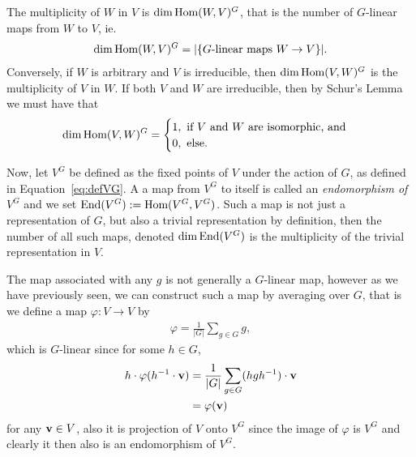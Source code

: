 \begin{proposition}
	The multiplicity of $W$ in $V$ is $\dim \text{Hom}(W,V)^G$, that is the number of $G$-linear maps from $W$ to $V$, ie. \begin{align*}
		\dim \text{Hom}(W,V)^G = |\{\text{$G$-linear maps $W \rightarrow V$}\}|.
	\end{align*}
	Conversely, if $W$ is arbitrary and $V$ is irreducible, then $\dim \text{Hom} (V,W)^G$ is the multiplicity of $V$ in $W$. If both $V$ and $W$ are irreducible, then by Schur's Lemma we must have that
	\begin{align}\label{eq:dimhomVWG}
		\dim \text{Hom} (V,W)^G = \begin{cases}
			1, \text{ if $V$ and $W$ are isomorphic, and} \\
			0, \text{ else.}
		\end{cases}
	\end{align}
\end{proposition}

Now, let $V^G$ be defined as the fixed points of $V$ under the action of $G$, as defined in Equation~\ref{eq:defVG}. A a map from $V^G$ to itself is called an \textit{endomorphism of $V^G$} and we set $\text{End}(V^G) := \text{Hom}(V^G, V^G)$. Such a map is not just a representation of $G$, but also a trivial representation by definition, then the number of all such maps, denoted $\dim \text{End}(V^G)$ is the multiplicity of the trivial representation in $V$. 

The map associated with any $g$ is not generally a $G$-linear map, however as we have previously seen, we can construct such a map by averaging over $G$, that is we define a map $\varphi: V \rightarrow V$ by
\begin{align*}
	\varphi = \frac{1}{|G|} \sum_{g \in G} g,
\end{align*}
which is $G$-linear since for some $h \in G$, \begin{align*}
	h \cdot \varphi(h^{-1} \cdot \mathbf{v}) &= \frac{1}{|G|} \sum_{g \in G} (hgh^{-1}) \cdot \mathbf{v} \\
	&= \varphi(\mathbf{v})
\end{align*} for any $\mathbf{v} \in V$, also it is projection of $V$ onto $V^G$ since the image of $\varphi$ is $V^G$ and clearly it then also is an endomorphism of $V^G$. 


